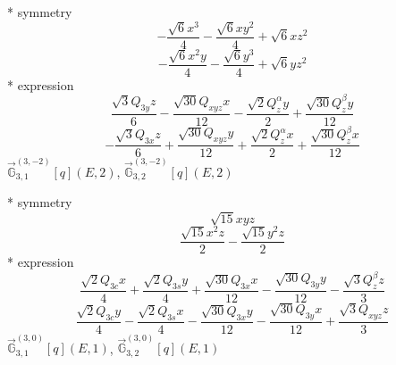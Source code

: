\documentclass[fleqn,8pt]{jsarticle}
\begin{document}
\noindent\quad ** symmetry
\begin{dmath*}
- \frac{\sqrt{6} x^{3}}{4} - \frac{\sqrt{6} x y^{2}}{4} + \sqrt{6} x z^{2}
\end{dmath*}
\begin{dmath*}
- \frac{\sqrt{6} x^{2} y}{4} - \frac{\sqrt{6} y^{3}}{4} + \sqrt{6} y z^{2}
\end{dmath*}
\noindent\quad ** expression
\begin{dmath*}
\frac{\sqrt{3} Q_{3y} z}{6} - \frac{\sqrt{30} Q_{xyz} x}{12} - \frac{\sqrt{2} Q_{z}^{\alpha} y}{2} + \frac{\sqrt{30} Q_{z}^{\beta} y}{12}
\end{dmath*}
\begin{dmath*}
- \frac{\sqrt{3} Q_{3x} z}{6} + \frac{\sqrt{30} Q_{xyz} y}{12} + \frac{\sqrt{2} Q_{z}^{\alpha} x}{2} + \frac{\sqrt{30} Q_{z}^{\beta} x}{12}
\end{dmath*}
\noindent\quad $\vec{\mathbb{G}}_{3,1}^{(3,-2)}[q](E,2)$, $\vec{\mathbb{G}}_{3,2}^{(3,-2)}[q](E,2)$

\noindent\quad ** symmetry
\begin{dmath*}
\sqrt{15} x y z
\end{dmath*}
\begin{dmath*}
\frac{\sqrt{15} x^{2} z}{2} - \frac{\sqrt{15} y^{2} z}{2}
\end{dmath*}
\noindent\quad ** expression
\begin{dmath*}
\frac{\sqrt{2} Q_{3c} x}{4} + \frac{\sqrt{2} Q_{3s} y}{4} + \frac{\sqrt{30} Q_{3x} x}{12} - \frac{\sqrt{30} Q_{3y} y}{12} - \frac{\sqrt{3} Q_{z}^{\beta} z}{3}
\end{dmath*}
\begin{dmath*}
\frac{\sqrt{2} Q_{3c} y}{4} - \frac{\sqrt{2} Q_{3s} x}{4} - \frac{\sqrt{30} Q_{3x} y}{12} - \frac{\sqrt{30} Q_{3y} x}{12} + \frac{\sqrt{3} Q_{xyz} z}{3}
\end{dmath*}
\noindent\quad $\vec{\mathbb{G}}_{3,1}^{(3,0)}[q](E,1)$, $\vec{\mathbb{G}}_{3,2}^{(3,0)}[q](E,1)$
\end{document}
